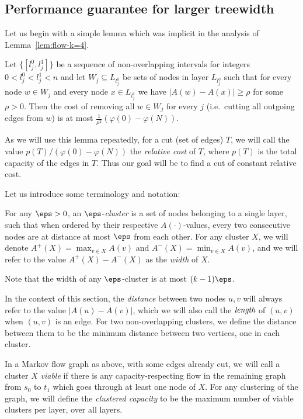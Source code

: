 \subsection{Performance guarantee for larger treewidth}

Let us begin with a simple lemma which was implicit in the analysis of Lemma~\ref{lem:flow-k=4}.

\begin{lemma}\label{lem:cut-charge} Let  $\{[l^0_j,l^1_j]\}$ be a sequence of non-overlapping intervals for integers $0<l^0_j<l^1_j<n$ and let $W_j\subseteq L_{l^0_j}$ be sets of nodes in layer $L_{l^0_j}$ such that for every node $w\in W_j$ and every node $x\in L_{l^1_j}$ we have $|A(w)-A(x)|\geq\rho$ for some $\rho>0$. Then the cost of removing all $w\in W_j$ for every $j$ (i.e.\ cutting all outgoing edges from $w$) is at most $\frac{1}{\rho^2}(\varphi(0)-\varphi(N))$.
\end{lemma}

As we will use this lemma repeatedly, for a cut (set of edges) $T$, we will call the value $p(T)/(\varphi(0)-\varphi(N))$ the \emph{relative cost} of $T$, where $p(T)$ is the total capacity of the edges in $T$. Thus our goal will be to find a cut of constant relative cost.

Let us introduce some terminology and notation:

\begin{definition} For any $\eps>0$, an $\eps$-\emph{cluster} is a set of nodes belonging to a single layer, such that when ordered by their respective $A(\cdot)$-values, every two consecutive nodes are at distance at most $\eps$ from each other. For any cluster $X$, we will denote $A^+(X)=\max_{v\in X}A(v)$ and $A^-(X)=\min_{v\in X}A(v)$, and we will refer to the value $A^+(X)-A^-(X)$ as the \emph{width} of $X$.
\end{definition}

Note that the width of any $\eps$-cluster is at most $(k-1)\eps$.

\begin{definition} In the context of this section, the \emph{distance} between two nodes $u,v$ will always refer to the value $|A(u)-A(v)|$, which we will also call the $\emph{length}$ of $(u,v)$ when $(u,v)$ is an edge. For two non-overlapping clusters, we define the distance between them to be the minimum distance between two vertices, one in each cluster.
\end{definition}

\begin{definition} In a Markov flow graph as above, with some edges already cut, we will call a cluster $X$ \emph{viable} if there is any capacity-respecting flow in the remaining graph from $s_0$ to $t_1$ which goes through at least one node of $X$. For any clustering of the graph, we will define the \emph{clustered capacity} to be the maximum number of viable clusters per layer, over all layers.
\end{definition}


